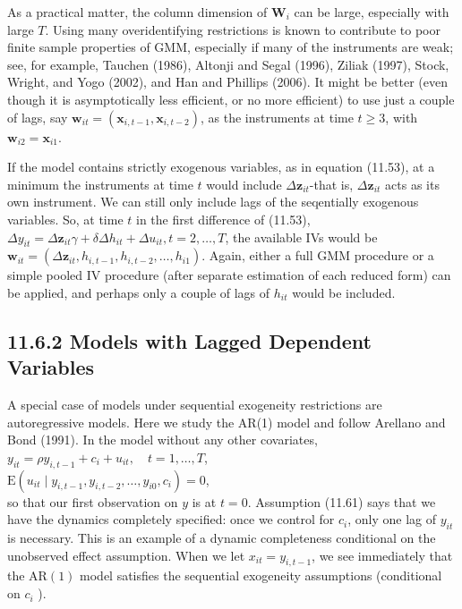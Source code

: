 \documentclass[10pt]{article}
\begin{document}
As a practical matter, the column dimension of $\mathbf{W}_{i}$ can be large, especially with large $T$. Using many overidentifying restrictions is known to contribute to poor finite sample properties of GMM, especially if many of the instruments are weak; see, for example, Tauchen (1986), Altonji and Segal (1996), Ziliak (1997), Stock, Wright, and Yogo (2002), and Han and Phillips (2006). It might be better (even though it is asymptotically less efficient, or no more efficient) to use just a couple of lags, say $\mathbf{w}_{i t}=\left(\mathbf{x}_{i, t-1}, \mathbf{x}_{i, t-2}\right)$, as the instruments at time $t \geq 3$, with $\mathbf{w}_{i 2}=\mathbf{x}_{i 1}$.

If the model contains strictly exogenous variables, as in equation (11.53), at a minimum the instruments at time $t$ would include $\Delta \mathbf{z}_{i t}$-that is, $\Delta \mathbf{z}_{i t}$ acts as its own instrument. We can still only include lags of the seqentially exogenous variables. So, at time $t$ in the first difference of (11.53), $\Delta y_{i t}=\Delta \mathbf{z}_{i t} \gamma+\delta \Delta h_{i t}+\Delta u_{i t}, t=2, \ldots, T$, the available IVs would be $\mathbf{w}_{i t}=\left(\Delta \mathbf{z}_{i t}, h_{i, t-1}, h_{i, t-2}, \ldots, h_{i 1}\right)$. Again, either a full GMM procedure or a simple pooled IV procedure (after separate estimation of each reduced form) can be applied, and perhaps only a couple of lags of $h_{i t}$ would be included.

\subsection*{11.6.2 Models with Lagged Dependent Variables}
A special case of models under sequential exogeneity restrictions are autoregressive models. Here we study the AR(1) model and follow Arellano and Bond (1991). In the model without any other covariates,\\
$y_{i t}=\rho y_{i, t-1}+c_{i}+u_{i t}, \quad t=1, \ldots, T$,\\
$\mathrm{E}\left(u_{i t} \mid y_{i, t-1}, y_{i, t-2}, \ldots, y_{i 0}, c_{i}\right)=0$,\\
so that our first observation on $y$ is at $t=0$. Assumption (11.61) says that we have the dynamics completely specified: once we control for $c_{i}$, only one lag of $y_{i t}$ is necessary. This is an example of a dynamic completeness conditional on the unobserved effect assumption. When we let $x_{i t}=y_{i, t-1}$, we see immediately that the $\mathrm{AR}(1)$ model satisfies the sequential exogeneity assumptions (conditional on $c_{i}$ ).
\end{document}
